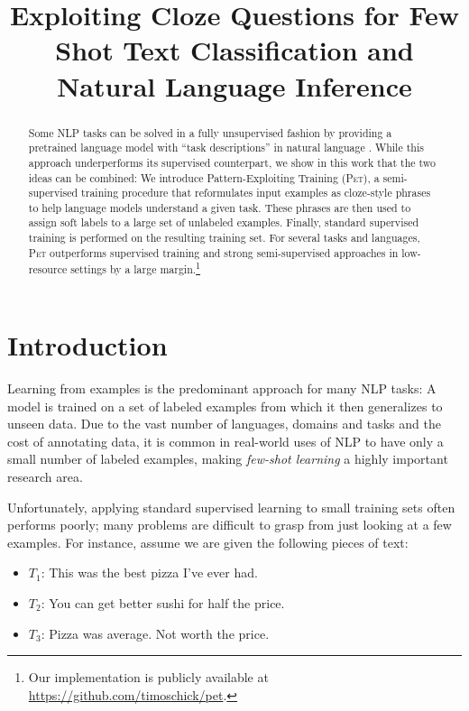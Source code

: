 \title{Exploiting Cloze Questions for Few Shot Text Classification and Natural Language Inference}

\begin{abstract}
Some NLP tasks can be solved in a fully unsupervised fashion by providing a pretrained language model with ``task descriptions'' in natural language \citep[e.g.,][]{radford2018language}. While this approach underperforms its supervised counterpart, we show in this work that the two ideas can be combined: We introduce Pattern-Exploiting Training (\textsc{Pet}), a semi-supervised training procedure that reformulates input examples as cloze-style phrases to help language models understand a given task. These phrases are then used to assign soft labels to a large set of unlabeled examples. Finally, standard supervised training is performed on the resulting training set. For several tasks and languages,
\textsc{Pet} outperforms supervised training and strong semi-supervised approaches in low-resource settings by a large margin.\footnote{Our implementation is publicly available at \url{https://github.com/timoschick/pet}.}
\end{abstract}

\section{Introduction}

Learning from examples is the predominant approach for many NLP tasks: A model is trained on a set of labeled examples from which it then generalizes to unseen data. Due to the vast number of languages, domains and tasks and the cost of annotating data, it is common in real-world uses of NLP to have only a small number of labeled examples, making \emph{few-shot learning} a highly important research area.

Unfortunately, applying standard supervised learning to small training sets often performs poorly; many problems are difficult to grasp from just looking at a few examples. For instance, assume we are given the following pieces of text:

\begin{itemize}
\item $T_1$: This was the best pizza I've ever had. 
\item $T_2$: You can get better sushi for half the price.
\item $T_3$: Pizza was average. Not worth the price.
\end{itemize}

